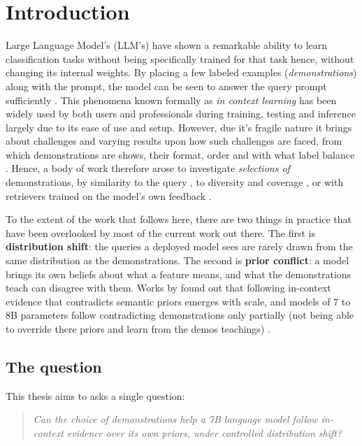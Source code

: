 \chapter{Introduction}
\label{ch:intro}

Large Language Model's (LLM's) have shown a remarkable ability to learn classification tasks without being specifically trained for that task hence, without changing its internal weights. By placing a few labeled examples (\emph{demonstrations}) along with the prompt, the model can be seen to answer the query prompt sufficiently \citep{brown2020language, dong2024survey}. This phenomena known formally as \emph{in context learning} has been widely used by both users and professionals during training, testing and inference largely due to its ease of use and setup. However, due it's fragile nature it brings about challenges and varying results upon how such challenges are faced, from which demonstrations are shows, their format, order and with what label balance \citep{zhao2021calibrate, lu2022fantastically, min2022rethinking}. Hence, a body of work therefore arose to investigate \emph{selections of} demonstrations, by similarity to the query \citep{liu2022what}, to diversity and coverage \citep{levy2023diverse,gupta2023coverage}, or with retrievers trained on the model's own feedback \citep{rubin2022learning,li2023unified,ye2023compositional}.


To the extent of the work that follows here, there are two things in practice that have been overlooked by most of the current work out there. 
The first is \textbf{distribution shift}: the queries a deployed model sees are rarely drawn from the same distribution as the demonstrations.
The second is \textbf{prior conflict}: a model brings its own beliefs about what a feature means, and what the demonstrations teach can disagree with them. Works by \citet{wei2023larger} found out that following in-context evidence that contradicts semantic priors emerges with scale, and models of 7 to 8B parameters follow contradicting demonstrations only partially (not being able to override there priors and learn from the demos teachings) \citep{krishnakumar2025semantic,kossen2024incontext}.


\newpage
\section{The question}

This thesis aims to asks a single question:

\begin{quote}
\textit{Can the choice of demonstrations help a 7B language model follow in-context evidence over its own priors, under controlled distribution shift?}
\end{quote}

